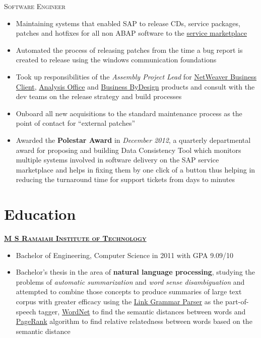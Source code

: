 \documentclass{article}
\begin{document}
{\raggedright{\textsc{Software Engineer}}} \hfill {}

\begin{itemize}[noitemsep,nolistsep]
\item Maintaining systems that enabled SAP to release CDs, service packages, patches and hotfixes for all non ABAP software to the \href{https://support.sap.com/en/index.html}{service marketplace}
\item Automated the process of releasing patches from the time a bug report is created to release using the windows communication foundations
\item Took up responsibilities of the \textit{Assembly Project Lead} for \href{https://help.sap.com/docs/SAP_NETWEAVER_731_BW_ABAP/9737050ef01843f19572591b42128f1b/4c5b13bf97817513e10000000a42189b.html?version=7.31.23}{NetWeaver Business Client}, \href{https://help.sap.com/docs/SAP_BUSINESSOBJECTS_ANALYSIS_OFFICE?version=2.8.0.0}{Analysis Office} and \href{https://www.sap.com/products/business-bydesign.html}{Business ByDesign} products and consult with the dev teams on the release strategy and build processes
\item Onboard all new acquisitions to the standard maintenance process as the point of contact for “external patches”
\item Awarded the \textbf{Polestar Award} in \textit{December 2012}, a quarterly departmental award for proposing and building Data Consistency Tool which monitors multiple systems involved in software delivery on the SAP service marketplace and helps in fixing them by one click of a button thus helping in reducing the turnaround time for support tickets from days to minutes
\end{itemize}

\section{Education}
{\raggedright{\textsc{\textbf{\href{http://www.msrit.edu}{M S Ramaiah Institute of Technology}}}}} \hfill {}

\begin{itemize}[noitemsep,nolistsep]
\item Bachelor of Engineering, Computer Science in 2011 with GPA 9.09/10
\item Bachelor’s thesis in the area of \textbf{natural language processing}, studying the problems of \textit{automatic summarization} and \textit{word sense disambiguation} and attempted to combine those concepts to produce summaries of large text corpus with greater efficacy using the \href{https://www.link.cs.cmu.edu/link/}{Link Grammar Parser} as the part-of-speech tagger, \href{https://wordnet.princeton.edu/}{WordNet} to find the semantic distances between words and \href{https://en.wikipedia.org/wiki/PageRank}{PageRank} algorithm to find relative relatedness between words based on the semantic distance
\end{itemize}
\end{document}
